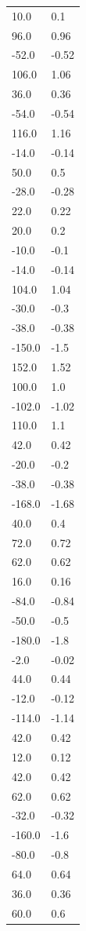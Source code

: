 \begin{longtable}{ll}
10.0 & 0.1 \\
96.0 & 0.96 \\
-52.0 & -0.52 \\
106.0 & 1.06 \\
36.0 & 0.36 \\
-54.0 & -0.54 \\
116.0 & 1.16 \\
-14.0 & -0.14 \\
50.0 & 0.5 \\
-28.0 & -0.28 \\
22.0 & 0.22 \\
20.0 & 0.2 \\
-10.0 & -0.1 \\
-14.0 & -0.14 \\
104.0 & 1.04 \\
-30.0 & -0.3 \\
-38.0 & -0.38 \\
-150.0 & -1.5 \\
152.0 & 1.52 \\
100.0 & 1.0 \\
-102.0 & -1.02 \\
110.0 & 1.1 \\
42.0 & 0.42 \\
-20.0 & -0.2 \\
-38.0 & -0.38 \\
-168.0 & -1.68 \\
40.0 & 0.4 \\
72.0 & 0.72 \\
62.0 & 0.62 \\
16.0 & 0.16 \\
-84.0 & -0.84 \\
-50.0 & -0.5 \\
-180.0 & -1.8 \\
-2.0 & -0.02 \\
44.0 & 0.44 \\
-12.0 & -0.12 \\
-114.0 & -1.14 \\
42.0 & 0.42 \\
12.0 & 0.12 \\
42.0 & 0.42 \\
62.0 & 0.62 \\
-32.0 & -0.32 \\
-160.0 & -1.6 \\
-80.0 & -0.8 \\
64.0 & 0.64 \\
36.0 & 0.36 \\
60.0 & 0.6 \\

\end{longtable}
